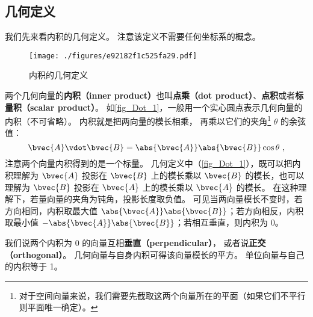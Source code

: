 
\subsection{几何定义}
我们先来看内积的几何定义。 注意该定义不需要任何坐标系的概念。
\begin{figure}[th]
\centering
\texttt{[image: ./figures/e92182f1c525fa29.pdf]}
\caption{内积的几何定义}\label{fig_Dot_1}
\end{figure}

两个几何向量的\textbf{内积（inner product）}也叫\textbf{点乘（dot product）}、\textbf{点积}或者\textbf{标量积（scalar product）}。 如\autoref{fig_Dot_1}，一般用一个实心圆点表示几何向量的内积（不可省略）。 内积就是把两向量的模长相乘， 再乘以它们的夹角\footnote{对于空间向量来说，我们需要先截取这两个向量所在的平面（如果它们不平行则平面唯一确定）。} $\theta$ 的余弦值：
\begin{equation}\label{eq_Dot_1}
\bvec{A} \vdot \bvec{B} = \abs{\bvec{A}} \abs{\bvec{B}} \cos\theta ~,
\end{equation}
注意两个向量内积得到的是一个标量。 几何定义中（\autoref{fig_Dot_1}），既可以把内积理解为 $\bvec{A}$ 投影在 $\bvec{B}$ 上的模长乘以 $\bvec{B}$ 的模长，也可以理解为 $\bvec{B}$ 投影在 $\bvec{A}$ 上的模长乘以 $\bvec{A}$ 的模长。 在这种理解下，若量向量的夹角为钝角，投影长度取负值。 可见当两向量模长不变时，若方向相同，内积取最大值 $\abs{\bvec{A}}\abs{\bvec{B}}$；若方向相反，内积取最小值 $-\abs{\bvec{A}}\abs{\bvec{B}}$；若相互垂直，则内积为 0。

我们说两个内积为 0 的向量互相\textbf{垂直（perpendicular）}， 或者说\textbf{正交（orthogonal）}。 几何向量与自身内积可得该向量模长的平方。 单位向量与自己的内积等于 1。 


